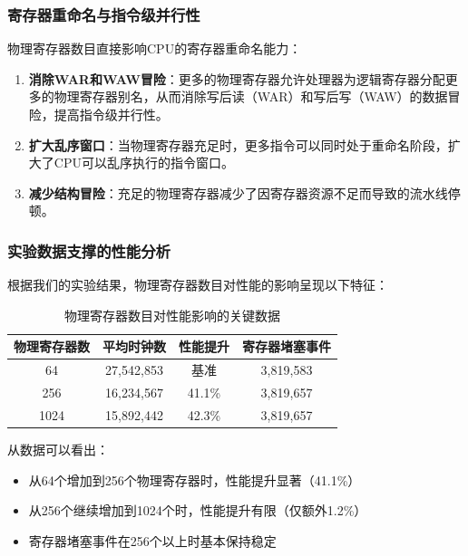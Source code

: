 \documentclass[a4paper]{article}
\begin{document}
\subsubsection{寄存器重命名与指令级并行性}

物理寄存器数目直接影响CPU的寄存器重命名能力：

\begin{enumerate}
    \item \textbf{消除WAR和WAW冒险}：更多的物理寄存器允许处理器为逻辑寄存器分配更多的物理寄存器别名，从而消除写后读（WAR）和写后写（WAW）的数据冒险，提高指令级并行性。
    
    \item \textbf{扩大乱序窗口}：当物理寄存器充足时，更多指令可以同时处于重命名阶段，扩大了CPU可以乱序执行的指令窗口。
    
    \item \textbf{减少结构冒险}：充足的物理寄存器减少了因寄存器资源不足而导致的流水线停顿。
\end{enumerate}

\subsubsection{实验数据支撑的性能分析}

根据我们的实验结果，物理寄存器数目对性能的影响呈现以下特征：

\begin{table}[htbp]
    \centering
    \caption{物理寄存器数目对性能影响的关键数据}
    \begin{tabular}{|c|c|c|c|}
        \hline
        \textbf{物理寄存器数} & \textbf{平均时钟数} & \textbf{性能提升} & \textbf{寄存器堵塞事件} \\
        \hline
        64 & 27,542,853 & 基准 & 3,819,583 \\
        \hline
        256 & 16,234,567 & 41.1\% & 3,819,657 \\
        \hline
        1024 & 15,892,442 & 42.3\% & 3,819,657 \\
        \hline
    \end{tabular}
\end{table}

从数据可以看出：
\begin{itemize}
    \item 从64个增加到256个物理寄存器时，性能提升显著（41.1\%）
    \item 从256个继续增加到1024个时，性能提升有限（仅额外1.2\%）
    \item 寄存器堵塞事件在256个以上时基本保持稳定
\end{itemize}
\end{document}
